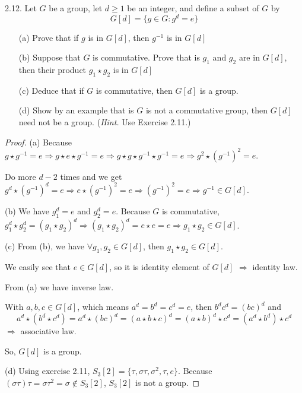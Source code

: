 2.12. Let $G$ be a group, let $d \geq 1$ be an integer, and define a subset of $G$ by
\begin{equation*}
    G[d] = \{g \in G: g^d = e\}
\end{equation*}

\begin{enumerate}
    \item[(a)] Prove that if $g$ is in $G[d]$, then $g^{-1}$ is in $G[d]$
    \item[(b)] Suppose that $G$ is commutative. Prove that is $g_1$ and $g_2$ are in $G[d]$, then their product $g_1 \star g_2$ is in $G[d]$
    \item[(c)] Deduce that if $G$ is commutative, then $G[d]$ is a group.
    \item[(d)] Show by an example that is $G$ is not a commutative group, then $G[d]$ need not be a group. (\textit{Hint.} Use Exercise 2.11.)
\end{enumerate}

\begin{proof}
    (a) Because $g \star g^{-1} = e \Rightarrow g \star e \star g^{-1} = e \Rightarrow g \star g \star g^{-1} \star g^{-1} = e \Rightarrow g^2 \star (g^{-1})^2 = e$.

    Do more $d-2$ times and we get $g^d \star (g^{-1})^d = e \Rightarrow e \star (g^{-1})^2 = e \Rightarrow (g^{-1})^2 = e \Rightarrow g^{-1} \in G[d]$.

    (b) We have $g_1^d = e$ and $g_2^d = e$. Because $G$ is commutative, $g_1^d \star g_2^d = (g_1 \star g_2)^d \Rightarrow (g_1 \star g_2)^d = e \star e = e \Rightarrow g_1 \star g_2 \in G[d]$.

    (c) From (b), we have $\forall g_1, g_2 \in G[d]$, then $g_1 \star g_2 \in G[d]$.

    We easily see that $e \in G[d]$, so it is identity element of $G[d]$ $\Rightarrow$ identity law.

    From (a) we have inverse law.

    With $a, b, c \in G[d]$, which means $a^d = b^d = c^d = e$, then $b^d c^d = (bc)^d$ and
    \begin{equation*}
        a^d \star (b^d \star c^d) = a^d \star (bc)^d =(a \star b \star c)^d = (a \star b)^d \star c^d = (a^d \star b^d) \star c^d
    \end{equation*}
    $\Rightarrow$ associative law.

    So, $G[d]$ is a group.

    (d) Using exercise 2.11, $S_3[2] = \{\tau, \sigma\tau, \sigma^2, \tau, e \}$. Because $(\sigma\tau)\tau = \sigma\tau^2 = \sigma \notin S_3[2]$, $S_3[2]$ is not a group. 
\end{proof}

